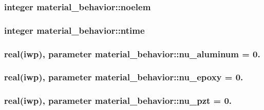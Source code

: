 \subsubsection[{noelem}]{\setlength{\rightskip}{0pt plus 5cm}integer material\+\_\+behavior\+::noelem}\label{classmaterial__behavior_a5149a02e7e855d7d7379e213b8b54139}
\hypertarget{classmaterial__behavior_a465c3fa1041a65365ebd4e25a80906ba}{}
\subsubsection[{ntime}]{\setlength{\rightskip}{0pt plus 5cm}integer material\+\_\+behavior\+::ntime}\label{classmaterial__behavior_a465c3fa1041a65365ebd4e25a80906ba}
\hypertarget{classmaterial__behavior_ae5963b3890fba3ea39240613fe4a0557}{}
\subsubsection[{nu\+\_\+aluminum}]{\setlength{\rightskip}{0pt plus 5cm}real(iwp), parameter material\+\_\+behavior\+::nu\+\_\+aluminum = 0.}\label{classmaterial__behavior_ae5963b3890fba3ea39240613fe4a0557}
\hypertarget{classmaterial__behavior_abac50d1debac288be1148e878784e2eb}{}
\subsubsection[{nu\+\_\+epoxy}]{\setlength{\rightskip}{0pt plus 5cm}real(iwp), parameter material\+\_\+behavior\+::nu\+\_\+epoxy = 0.}\label{classmaterial__behavior_abac50d1debac288be1148e878784e2eb}
\hypertarget{classmaterial__behavior_aa17e406d8f9854210f8715a752d70e43}{}
\subsubsection[{nu\+\_\+pzt}]{\setlength{\rightskip}{0pt plus 5cm}real(iwp), parameter material\+\_\+behavior\+::nu\+\_\+pzt = 0.}\label{classmaterial__behavior_aa17e406d8f9854210f8715a752d70e43}
\hypertarget{classmaterial__behavior_a50600c5b8a42a94a1fcf054767620811}{}
